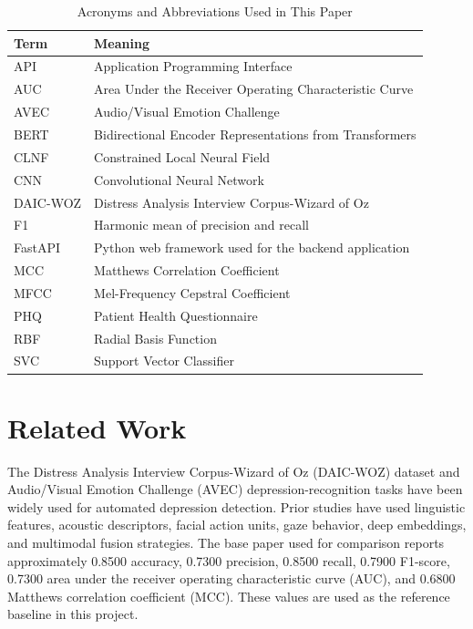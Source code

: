 \documentclass[conference]{IEEEtran}
\begin{document}
\begin{table}[htbp]
\caption{Acronyms and Abbreviations Used in This Paper}
\label{tab:acronyms}
\centering
\scriptsize
\setlength{\tabcolsep}{3pt}
\begin{tabular}{p{1.5cm}p{6.0cm}}
\toprule
\textbf{Term} & \textbf{Meaning} \\
\midrule
API & Application Programming Interface \\
AUC & Area Under the Receiver Operating Characteristic Curve \\
AVEC & Audio/Visual Emotion Challenge \\
BERT & Bidirectional Encoder Representations from Transformers \\
CLNF & Constrained Local Neural Field \\
CNN & Convolutional Neural Network \\
DAIC-WOZ & Distress Analysis Interview Corpus-Wizard of Oz \\
F1 & Harmonic mean of precision and recall \\
FastAPI & Python web framework used for the backend application \\
MCC & Matthews Correlation Coefficient \\
MFCC & Mel-Frequency Cepstral Coefficient \\
PHQ & Patient Health Questionnaire \\
RBF & Radial Basis Function \\
SVC & Support Vector Classifier \\
\bottomrule
\end{tabular}
\end{table}

\section{Related Work}
The Distress Analysis Interview Corpus-Wizard of Oz (DAIC-WOZ) dataset and Audio/Visual Emotion Challenge (AVEC) depression-recognition tasks have been widely used for automated depression detection. Prior studies have used linguistic features, acoustic descriptors, facial action units, gaze behavior, deep embeddings, and multimodal fusion strategies. The base paper used for comparison reports approximately 0.8500 accuracy, 0.7300 precision, 0.8500 recall, 0.7900 F1-score, 0.7300 area under the receiver operating characteristic curve (AUC), and 0.6800 Matthews correlation coefficient (MCC). These values are used as the reference baseline in this project.
\end{document}
